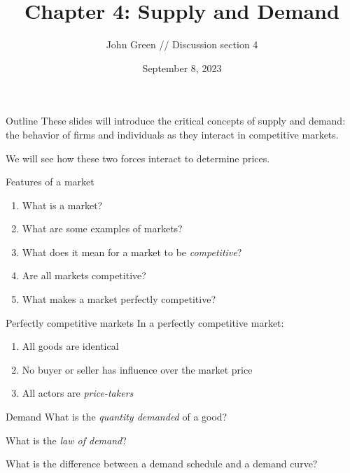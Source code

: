 \documentclass[aspectratio=169]{beamer}
\title{Chapter 4: Supply and Demand}
\author{John Green //
    Discussion section 4}
\date{September 8, 2023}
\begin{document}
\begin{frame}
    \titlepage 
\end{frame}

\begin{frame}{Outline}
    These slides will introduce the critical concepts of supply and demand: the behavior of firms and individuals as they interact in competitive markets.
    
    \medskip

    We will see how these two forces interact to determine prices.
\end{frame}

\begin{frame}{Features of a market}
    \begin{enumerate}
        \item What is a market?
        \item What are some examples of markets?
        \item What does it mean for a market to be \textit{competitive}?
        \item Are all markets competitive?
        \item What makes a market perfectly competitive?
    \end{enumerate}
\end{frame}

\begin{frame}{Perfectly competitive markets}
    In a perfectly competitive market:
    \begin{enumerate}
        \item All goods are identical
        \item No buyer or seller has influence over the market price
        \item All actors are \textit{price-takers}
    \end{enumerate}
\end{frame}

\begin{frame}{Demand}
    What is the \textit{quantity demanded} of a good?

    \medskip

    What is the \textit{law of demand}?

    \medskip

    What is the difference between a demand schedule and a demand curve?

\end{frame} 
\end{document}
